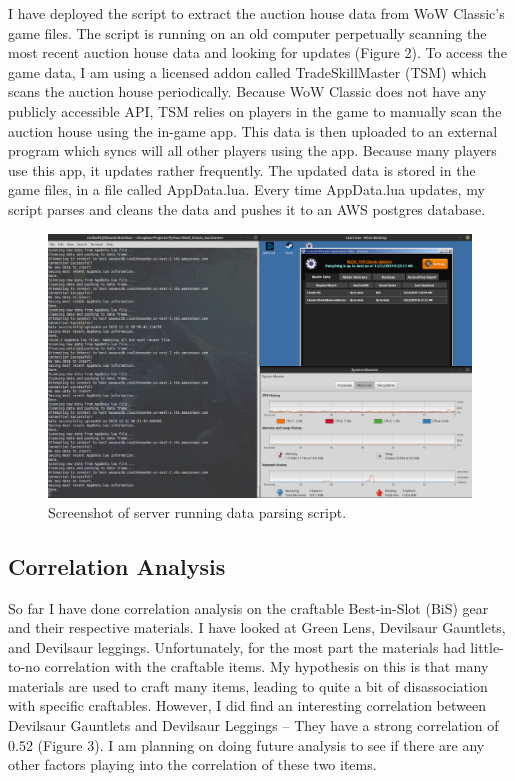 \documentclass[sigconf]{acmart}
\begin{document}
	I have deployed the script to extract the auction house data from WoW Classic’s game files. The script is running on an old computer perpetually scanning the most recent auction house data and looking for updates (Figure 2). To access the game data, I am using a licensed addon called TradeSkillMaster (TSM) which scans the auction house periodically. Because WoW Classic does not have any publicly accessible API, TSM relies on players in the game to manually scan the auction house using the in-game app. This data is then uploaded to an external program which syncs will all other players using the app. Because many players use this app, it updates rather frequently. The updated data is stored in the game files, in a file called AppData.lua. Every time AppData.lua updates, my script parses and cleans the data and pushes it to an AWS postgres database. 

\begin{figure}[h]
  \centering
  \includegraphics[width=\linewidth]{Server_Screenshot}
  \caption{Screenshot of server running data parsing script.}
\end{figure}

\subsection{Correlation Analysis}

So far I have done correlation analysis on the craftable Best-in-Slot (BiS) gear and their respective materials. I have looked at Green Lens,  Devilsaur Gauntlets, and Devilsaur leggings. Unfortunately, for the most part the materials had little-to-no correlation with the craftable items. My hypothesis on this is that many materials are used to craft many items, leading to quite a bit of disassociation with specific craftables. However, I did find an interesting correlation between Devilsaur Gauntlets and Devilsaur Leggings – They have a strong correlation of 0.52 (Figure 3). I am planning on doing future analysis to see if there are any other factors playing into the correlation of these two items.
\end{document}
